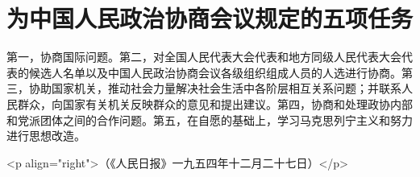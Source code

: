 \section[为中国人民政治协商会议规定的五项任务（一九五四年十二月）]{为中国人民政治协商会议规定的五项任务}


第一，协商国际问题。第二，对全国人民代表大会代表和地方同级人民代表大会代表的候选人名单以及中国人民政治协商会议各级组织组成人员的人选进行协商。第三，协助国家机关，推动社会力量解决社会生活中各阶层相互关系问题；并联系人民群众，向国家有关机关反映群众的意见和提出建议。第四，协商和处理政协内部和党派团体之间的合作问题。第五，在自愿的基础上，学习马克思列宁主义和努力进行思想改造。

<p align="right">（《人民日报》一九五四年十二月二十七日）</p>


